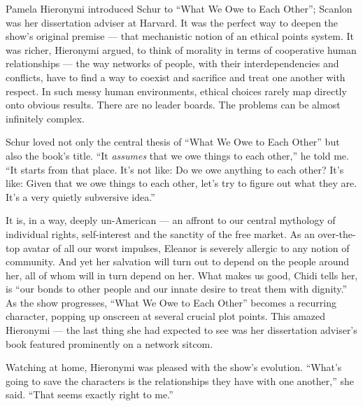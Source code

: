 Pamela Hieronymi introduced Schur to ``What We Owe to Each Other'';
Scanlon was her dissertation adviser at Harvard. It was the perfect way
to deepen the show's original premise --- that mechanistic notion of an
ethical points system. It was richer, Hieronymi argued, to think of
morality in terms of cooperative human relationships --- the way
networks of people, with their interdependencies and conflicts, have to
find a way to coexist and sacrifice and treat one another with respect.
In such messy human environments, ethical choices rarely map directly
onto obvious results. There are no leader boards. The problems can be
almost infinitely complex.

Schur loved not only the central thesis of ``What We Owe to Each Other''
but also the book's title. ``It \emph{assumes} that we owe things to
each other,'' he told me. ``It starts from that place. It's not like: Do
we owe anything to each other? It's like: Given that we owe things to
each other, let's try to figure out what they are. It's a very quietly
subversive idea.''

It is, in a way, deeply un-American --- an affront to our central
mythology of individual rights, self-interest and the sanctity of the
free market. As an over-the-top avatar of all our worst impulses,
Eleanor is severely allergic to any notion of community. And yet her
salvation will turn out to depend on the people around her, all of whom
will in turn depend on her. What makes us good, Chidi tells her, is
``our bonds to other people and our innate desire to treat them with
dignity.'' As the show progresses, ``What We Owe to Each Other'' becomes
a recurring character, popping up onscreen at several crucial plot
points. This amazed Hieronymi --- the last thing she had expected to see
was her dissertation adviser's book featured prominently on a network
sitcom.

Watching at home, Hieronymi was pleased with the show's evolution.
``What's going to save the characters is the relationships they have
with one another,'' she said. ``That seems exactly right to me.''

